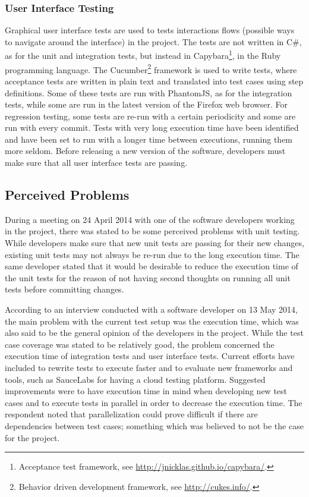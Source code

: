 \documentclass[a4paper,english,12pt]{report}
\begin{document}
\subsubsection{User Interface Testing}
Graphical user interface tests are used to tests interactions flows (possible ways to navigate around the interface) in the project. The tests are not written in C\#, as for the unit and integration tests, but instead in Capybara\footnote{Acceptance test framework, see \url{http://jnicklas.github.io/capybara/}.}, in the Ruby programming language. The Cucumber\footnote{Behavior driven development framework, see \url{http://cukes.info/}.} framework is used to write tests, where acceptance tests are written in plain text and translated into test cases using step definitions. Some of these tests are run with PhantomJS, as for the integration tests, while some are run in the latest version of the Firefox web browser. For regression testing, some tests are re-run with a certain periodicity and some are run with every commit. Tests with very long execution time have been identified and have been set to run with a longer time between executions, running them more seldom. Before releasing a new version of the software, developers must make sure that all user interface tests are passing.

\subsection{Perceived Problems}\label{sec:perceived-problems}
During a meeting on 24 April 2014 with one of the software developers working in the project, there was stated to be some perceived problems with unit testing. While developers make sure that new unit tests are passing for their new changes, existing unit tests may not always be re-run due to the long execution time. The same developer stated that it would be desirable to reduce the execution time of the unit tests for the reason of not having second thoughts on running all unit tests before committing changes.

According to an interview conducted with a software developer on 13 May 2014, the main problem with the current test setup was the execution time, which was also said to be the general opinion of the developers in the project. While the test case coverage was stated to be relatively good, the problem concerned the execution time of integration tests and user interface tests. Current efforts have included to rewrite tests to execute faster and to evaluate new frameworks and tools, such as SauceLabs for having a cloud testing platform. Suggested improvements were to have execution time in mind when developing new test cases and to execute tests in parallel in order to decrease the execution time. The respondent noted that parallelization could prove difficult if there are dependencies between test cases; something which was believed to not be the case for the project.
\end{document}
